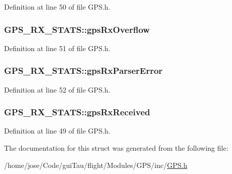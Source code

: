 Definition at line 50 of file G\-P\-S.\-h.

\hypertarget{struct_g_p_s___r_x___s_t_a_t_s_a1820743f7205c836af17a100834732b4}{
\subsubsection[{gps\-Rx\-Overflow}]{ G\-P\-S\-\_\-\-R\-X\-\_\-\-S\-T\-A\-T\-S\-::gps\-Rx\-Overflow}}\label{struct_g_p_s___r_x___s_t_a_t_s_a1820743f7205c836af17a100834732b4}


Definition at line 51 of file G\-P\-S.\-h.

\hypertarget{struct_g_p_s___r_x___s_t_a_t_s_a89bf9e59acfe33d00d4a319ec4f84cd7}{
\subsubsection[{gps\-Rx\-Parser\-Error}]{ G\-P\-S\-\_\-\-R\-X\-\_\-\-S\-T\-A\-T\-S\-::gps\-Rx\-Parser\-Error}}\label{struct_g_p_s___r_x___s_t_a_t_s_a89bf9e59acfe33d00d4a319ec4f84cd7}


Definition at line 52 of file G\-P\-S.\-h.

\hypertarget{struct_g_p_s___r_x___s_t_a_t_s_a2cc140780bc89226502f3903c38c8a30}{
\subsubsection[{gps\-Rx\-Received}]{ G\-P\-S\-\_\-\-R\-X\-\_\-\-S\-T\-A\-T\-S\-::gps\-Rx\-Received}}\label{struct_g_p_s___r_x___s_t_a_t_s_a2cc140780bc89226502f3903c38c8a30}


Definition at line 49 of file G\-P\-S.\-h.



The documentation for this struct was generated from the following file\-:\begin{DoxyCompactItemize}
\item 
/home/jose/\-Code/gui\-Tau/flight/\-Modules/\-G\-P\-S/inc/\hyperlink{_g_p_s_8h}{G\-P\-S.\-h}\end{DoxyCompactItemize}
